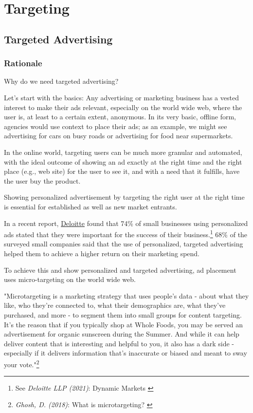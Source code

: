 %
%

\pagebreak
\section{Targeting}

\onehalfspacing

\subsection{Targeted Advertising}

\subsubsection{Rationale}

Why do we need targeted advertising?

Let's start with the basics: Any advertising or marketing business has a vested interest to make their ads relevant, especially on the world wide web, where the user is, at least to a certain extent, anonymous. In its very basic, offline form, agencies would use context to place their ads; as an example, we might see advertising for cars on busy roads or advertising for food near supermarkets.

In the online world, targeting users can be much more granular and automated, with the ideal outcome of showing an ad exactly at the right time and the right place (e.g., web site) for the user to see it, and with a need that it fulfills, have the user buy the product.

Showing personalized advertisement by targeting the right user at the right time is essential for established as well as new market entrants.

In a recent report, \href{https://www2.deloitte.com/de/de.html}{Deloitte} found that 74\% of small businesses using personalized ads stated that they were important for the success of their business.\footnote{See \textit{Deloitte LLP (2021)}: Dynamic Markets \cite{deloitteSmb}} 68\% of the surveyed small companies said that the use of personalized, targeted advertising helped them to achieve a higher return on their marketing spend.

To achieve this and show personalized and targeted advertising, ad placement uses micro-targeting on the world wide web.

"Microtargeting is a marketing strategy that uses people’s data - about what they like, who they’re connected to, what their demographics are, what they’ve purchased, and more - to segment them into small groups for content targeting. It’s the reason that if you typically shop at Whole Foods, you may be served an advertisement for organic sunscreen during the Summer. And while it can help deliver content that is interesting and helpful to you, it also has a dark side - especially if it delivers information that’s inaccurate or biased and meant to sway your vote."\footnote{\textit{Ghosh, D. (2018)}: What is microtargeting? \cite{mozillaBlog}}

